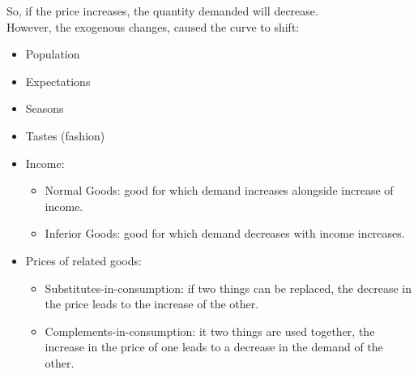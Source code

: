 \documentclass[nobib]{tufte-handout}
\begin{document}
So, if the price increases, the quantity demanded will decrease.\\
However, the exogenous changes, caused the curve to shift:
\begin{itemize}
    \item Population
    \item Expectations
    \item Seasons
    \item Tastes (fashion)
    \item Income:
          \begin{itemize}
              \item Normal Goods: good for which demand increases alongside increase of income.
              \item Inferior Goods: good for which demand decreases with income increases.
          \end{itemize}
    \item Prices of related goods:
          \begin{itemize}
              \item Substitutes-in-consumption: if two things can be replaced, the decrease in the
                    price leads to the increase of the other.
              \item Complements-in-consumption: it two things are used together, the increase in
                    the price of one leads to a decrease in the demand of the other.
          \end{itemize}
\end{itemize}

\end{document}

